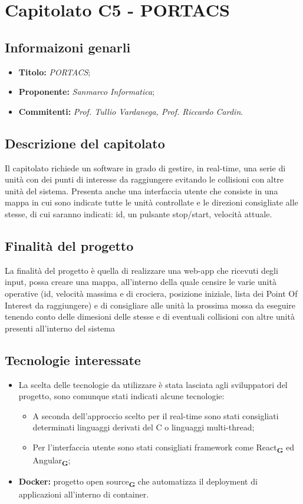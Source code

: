 \section{Capitolato C5 - PORTACS}
\subsection{Informaizoni genarli}
\begin{itemize}
    \item \textbf{Titolo:} \textit{PORTACS};
    \item \textbf{Proponente:} \textit{Sanmarco Informatica};
    \item \textbf{Commitenti:} \textit{Prof. Tullio Vardanega, Prof. Riccardo Cardin}.
\end{itemize}
\subsection{Descrizione del capitolato}
Il capitolato richiede un software in grado di gestire, in real-time, una serie di unità con dei punti di interesse da raggiungere evitando le collisioni con altre unità del sistema.
Presenta anche una interfaccia utente che consiste in una mappa in cui sono indicate tutte le unità controllate e le direzioni consigliate alle stesse,
di cui saranno indicati: id, un pulsante stop/start, velocità attuale.
\subsection{Finalità del progetto}
La finalità del progetto è quella di realizzare una web-app che ricevuti degli input, possa creare una mappa, all'interno della quale censire le varie unità operative
(id, velocità massima e di crociera, posizione iniziale, lista dei Point Of Interest da raggiungere) e di consigliare
alle unità la prossima mossa da eseguire tenendo conto delle dimesioni delle stesse e di eventuali collisioni con altre unità presenti all'interno del sistema
\subsection{Tecnologie interessate}
\begin{itemize}
    \item La scelta delle tecnologie da utilizzare è stata lasciata agli sviluppatori del progetto, sono comunque stati indicati alcune tecnologie:
          \begin{itemize}
              \item A seconda dell'approccio scelto per il real-time sono stati consigliati determinati linguaggi derivati del C o linguaggi multi-thread;
              \item Per l'interfaccia utente sono stati consigliati framework come React\textsubscript{\textbf{G}} ed Angular\textsubscript{\textbf{G}};
          \end{itemize}
    \item \textbf{Docker:} progetto open source\textsubscript{\textbf{G}} che automatizza il deployment di applicazioni all’interno di container.
\end{itemize}
